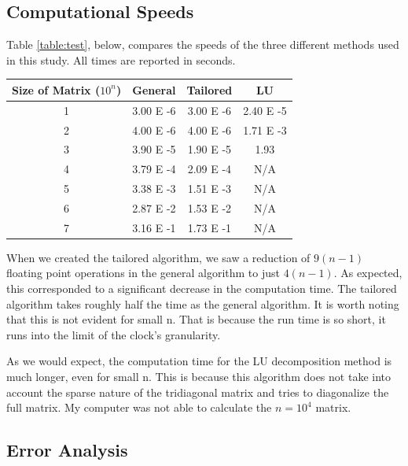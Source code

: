 \documentclass[%
oneside,                 %
final,                   %
10pt]{article}
\begin{document}
\subsection{Computational Speeds}

Table \ref{table:test}, below, compares the speeds of the three different methods used in this study.  All times are reported in seconds. 

\begin{center} 
\begin{tabular}{ |c|c|c|c| }
\hline
Size of Matrix ($10^n$) & General & Tailored & LU \\
\hline
1& 3.00 E -6 & 3.00 E -6 & 2.40 E -5\\ 
2 & 4.00 E -6 & 4.00 E -6 & 1.71 E -3 \\ 
3 & 3.90 E -5 & 1.90 E -5 & 1.93\\ 
4 & 3.79 E -4 & 2.09 E -4 & N/A\\ 
5 & 3.38 E -3 & 1.51 E -3  & N/A\\ 
6 & 2.87 E -2 & 1.53 E -2 & N/A\\ 
7 & 3.16 E -1 & 1.73 E -1& N/A\\ 
\hline
\end{tabular}
\label{table:test}
\end{center}

When we created the tailored algorithm, we saw a reduction of $9(n-1)$ floating point operations in the general algorithm to just $4(n-1)$.  As expected, this corresponded to a significant decrease in the computation time.  The tailored algorithm takes roughly half the time as the general algorithm.  It is worth noting that this is not evident for small n.  That is because the run time is so short, it runs into the limit of the clock's granularity.

As we would expect, the computation time for the LU decomposition method is much longer, even for small n.  This is because this algorithm does not take into account the sparse nature of the tridiagonal matrix and tries to diagonalize the full matrix.  My computer was not able to calculate the $n=10^4$ matrix.

\subsection{Error Analysis}
\end{document}
